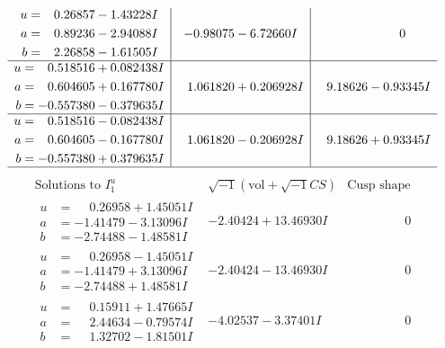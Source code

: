 \documentclass[1p]{elsarticle_modified}
\theoremstyle{definition}
\newcommand{\I}{\sqrt{-1}}
\begin{document}
$$\begin{array}{c|c|c}
\begin{aligned}
u &= \phantom{-}0.26857 - 1.43228 I \\
a &= \phantom{-}0.89236 - 2.94088 I \\
b &= \phantom{-}2.26858 - 1.61505 I\end{aligned}
 & -0.98075 - 6.72660 I & \phantom{-0.000000 } 0 \\ \hline\begin{aligned}
u &= \phantom{-}0.518516 + 0.082438 I \\
a &= \phantom{-}0.604605 + 0.167780 I \\
b &= -0.557380 - 0.379635 I\end{aligned}
 & \phantom{-}1.061820 + 0.206928 I & \phantom{-}9.18626 - 0.93345 I \\ \hline\begin{aligned}
u &= \phantom{-}0.518516 - 0.082438 I \\
a &= \phantom{-}0.604605 - 0.167780 I \\
b &= -0.557380 + 0.379635 I\end{aligned}
 & \phantom{-}1.061820 - 0.206928 I & \phantom{-}9.18626 + 0.93345 I\\
 \hline 
 \end{array}$$\newpage$$\begin{array}{c|c|c}  
\text{Solutions to }I^u_{1}& \I (\text{vol} + \sqrt{-1}CS) & \text{Cusp shape}\\
 \hline 
\begin{aligned}
u &= \phantom{-}0.26958 + 1.45051 I \\
a &= -1.41479 - 3.13096 I \\
b &= -2.74488 - 1.48581 I\end{aligned}
 & -2.40424 + 13.46930 I & \phantom{-0.000000 } 0 \\ \hline\begin{aligned}
u &= \phantom{-}0.26958 - 1.45051 I \\
a &= -1.41479 + 3.13096 I \\
b &= -2.74488 + 1.48581 I\end{aligned}
 & -2.40424 - 13.46930 I & \phantom{-0.000000 } 0 \\ \hline\begin{aligned}
u &= \phantom{-}0.15911 + 1.47665 I \\
a &= \phantom{-}2.44634 - 0.79574 I \\
b &= \phantom{-}1.32702 - 1.81501 I\end{aligned}
 & -4.02537 - 3.37401 I & \phantom{-0.000000 } 0 \\ \hline\begin{aligned}

\end{aligned}
\end{array}$$
\end{document}
